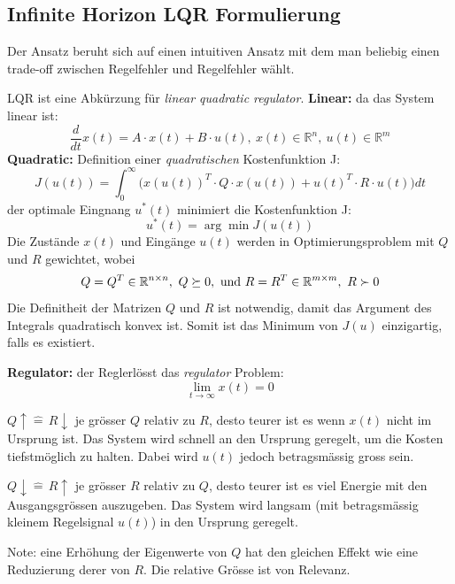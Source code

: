 \subsection{Infinite Horizon LQR Formulierung}
    Der Ansatz beruht sich auf einen intuitiven Ansatz mit dem man beliebig einen trade-off zwischen Regelfehler und Regelfehler wählt. 
    
    LQR ist eine Abkürzung für \textit{linear quadratic regulator}. 
    \textbf{Linear:} da das System linear ist:
    \[\frac{d}{dt}x(t) = A\cdot x(t) + B\cdot u(t),\ x(t) \in \mathbb{R}^n,\ u(t) \in \mathbb{R}^m\]
    \textbf{Quadratic:} Definition einer  \textit{quadratischen} Kostenfunktion J:
    \[J(u(t)) = \int_0^\infty\Big(x(u(t))^T\cdot Q\cdot x(u(t)) + u(t)^T \cdot R \cdot u(t)\Big)dt\]
    der optimale Eingnang $u^*(t)$ minimiert die Kostenfunktion J:
     \[u^*(t) = \arg\min J(u(t))\]
     Die Zustände $x(t)$ und Eingänge $u(t)$ werden in Optimierungsproblem mit $Q$ und $R$ gewichtet, wobei 
     \[Q=Q^T \in \mathbb{R}^{n\times n},\ Q \succeq 0,\ \textnormal{und}\ R = R^T \in \mathbb{R}^{m\times m},\ R\succ 0\]
     Die Definitheit der Matrizen $Q$ und $R$ ist notwendig, damit das Argument des Integrals quadratisch konvex ist.
     Somit ist das Minimum von $J(u)$ einzigartig, falls es existiert.
    
    \textbf{Regulator:}
    der Reglerlösst das \textit{regulator} Problem:
    \[\lim\limits_{t \to \infty}x(t)=0\]
    
    
    $\boxed{Q\uparrow \widehat{=}\, R \downarrow}$ je grösser $Q$ relativ zu $R$, desto teurer ist es wenn $x(t)$ nicht im Ursprung ist. Das System wird schnell an den Ursprung geregelt, um die Kosten tiefstmöglich zu halten. Dabei wird $u(t)$ jedoch betragsmässig gross sein.
    
    $\boxed{Q\downarrow \widehat{=}\, R \uparrow}$ je grösser $R$ relativ zu $Q$, desto teurer ist es viel Energie mit den Ausgangsgrössen auszugeben. Das System wird langsam (mit betragsmässig kleinem Regelsignal $u(t)$) in den Ursprung geregelt.
    
    Note: eine Erhöhung der Eigenwerte von $Q$ hat den gleichen Effekt wie eine Reduzierung derer von $R$. Die relative Grösse ist von Relevanz.
    
